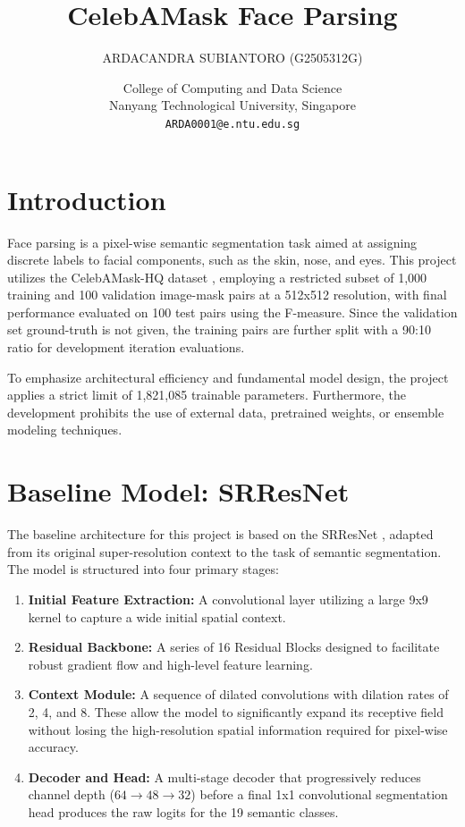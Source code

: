 \documentclass[10pt, a4paper]{article} %
\title{CelebAMask Face Parsing}
\author{
    ARDACANDRA SUBIANTORO (G2505312G)
    \and   
    College of Computing and Data Science \\
    Nanyang Technological University, Singapore \\
    \texttt{ARDA0001@e.ntu.edu.sg}
}
\date{}
\begin{document}
\maketitle

\section{Introduction}
Face parsing is a pixel-wise semantic segmentation task aimed at assigning discrete labels to facial components, such as the skin, nose, and eyes. This project utilizes the CelebAMask-HQ dataset \parencite{CelebAMask-HQ}, employing a restricted subset of 1,000 training and 100 validation image-mask pairs at a 512x512 resolution, with final performance evaluated on 100 test pairs using the F-measure. Since the validation set ground-truth is not given, the training pairs are further split with a 90:10 ratio for development iteration evaluations.

To emphasize architectural efficiency and fundamental model design, the project applies a strict limit of 1,821,085 trainable parameters. Furthermore, the development prohibits the use of external data, pretrained weights, or ensemble modeling techniques.

\section{Baseline Model: SRResNet}
The baseline architecture for this project is based on the SRResNet \parencite{ledig2017photorealisticsingleimagesuperresolution}, adapted from its original super-resolution context to the task of semantic segmentation. The model is structured into four primary stages: 

\begin{enumerate}
    \item \textbf{Initial Feature Extraction:} A convolutional layer utilizing a large 9x9 kernel to capture a wide initial spatial context.
    \item \textbf{Residual Backbone:} A series of 16 Residual Blocks designed to facilitate robust gradient flow and high-level feature learning.
    \item \textbf{Context Module:} A sequence of dilated convolutions with dilation rates of 2, 4, and 8. These allow the model to significantly expand its receptive field without losing the high-resolution spatial information required for pixel-wise accuracy.
    \item \textbf{Decoder and Head:} A multi-stage decoder that progressively reduces channel depth ($64 \to 48 \to 32$) before a final 1x1 convolutional segmentation head produces the raw logits for the 19 semantic classes.
\end{enumerate}
\end{document}
